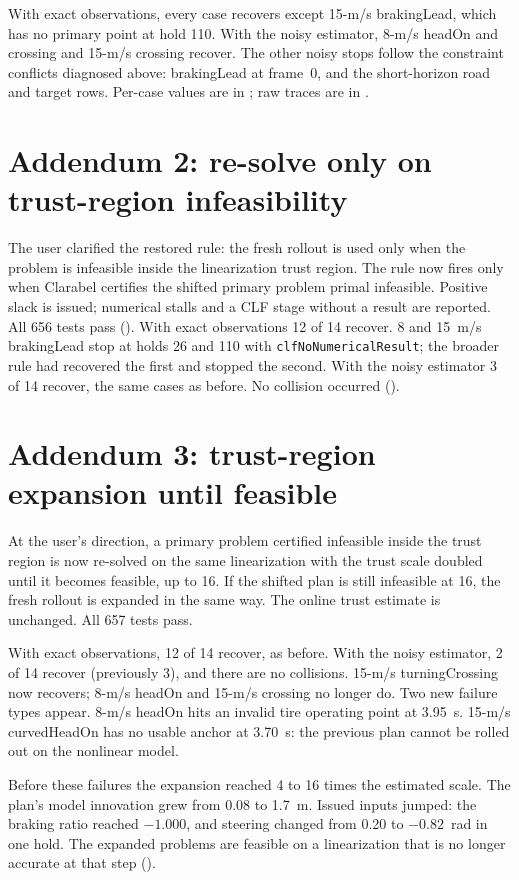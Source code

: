 \documentclass[11pt]{article}
\begin{document}
With exact observations, every case recovers except 15-m/s brakingLead, which
has no primary point at hold 110. With the noisy estimator, 8-m/s headOn and
crossing and 15-m/s crossing recover. The other noisy stops follow the
constraint conflicts diagnosed above: brakingLead at frame~0, and the
short-horizon road and target rows. Per-case values are in
; raw traces are in
.

\section{Addendum 2: re-solve only on trust-region infeasibility}
The user clarified the restored rule: the fresh rollout is used only when the
problem is infeasible inside the linearization trust region. The rule now
fires only when Clarabel certifies the shifted primary problem primal
infeasible. Positive slack is issued; numerical stalls and a CLF stage without
a result are reported. All 656 tests pass ().
With exact observations 12 of 14 recover. 8 and 15~m/s brakingLead stop at
holds 26 and 110 with \texttt{clfNoNumericalResult}; the broader rule had
recovered the first and stopped the second. With the noisy estimator 3 of 14
recover, the same cases as before. No collision occurred
().

\section{Addendum 3: trust-region expansion until feasible}
At the user's direction, a primary problem certified infeasible inside the
trust region is now re-solved on the same linearization with the trust scale
doubled until it becomes feasible, up to 16. If the shifted plan is still
infeasible at 16, the fresh rollout is expanded in the same way. The online
trust estimate is unchanged. All 657 tests pass.

With exact observations, 12 of 14 recover, as before. With the noisy estimator,
2 of 14 recover (previously 3), and there are no collisions. 15-m/s
turningCrossing now recovers; 8-m/s headOn and 15-m/s crossing no longer do.
Two new failure types appear. 8-m/s headOn hits an invalid tire operating point
at 3.95~s. 15-m/s curvedHeadOn has no usable anchor at 3.70~s: the previous
plan cannot be rolled out on the nonlinear model.

Before these failures the expansion reached 4 to 16 times the estimated scale.
The plan's model innovation grew from 0.08 to 1.7~m. Issued inputs jumped: the
braking ratio reached $-1.000$, and steering changed from 0.20 to $-0.82$~rad
in one hold. The expanded problems are feasible on a linearization that is no
longer accurate at that step ().
\end{document}
